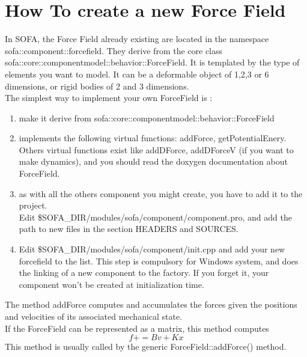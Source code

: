
\section{How To create a new Force Field}

In SOFA, the Force Field already existing are located in the namespace sofa::component::forcefield. They derive from the core class sofa::core::componentmodel::behavior::ForceField. It is templated by the type of elements you want to model. It can be a deformable object of 1,2,3 or 6 dimensions, or rigid bodies of 2 and 3 dimensions.\\
The simplest way to implement your own ForceField is :
\begin{enumerate}
 \item make it derive from sofa::core::componentmodel::behavior::ForceField
 \item implements the following virtual functions: addForce, getPotentialEnery. Others virtual functions exist like  addDForce, addDForceV (if you want to make dynamics), and you should read the doxygen documentation about ForceField. 
 \item as with all the others component you might create, you have to add it to the project. \\Edit \$SOFA\_DIR/modules/sofa/component/component.pro, and add the path to new files in the section HEADERS and SOURCES.
 \item Edit \$SOFA\_DIR/modules/sofa/component/init.cpp and add your new forcefield to the list. This step is compulsory for Windows system, and does the linking of a new component to the factory. If you forget it, your component won't be created at initialization time.
\end{enumerate}

The method addForce computes and accumulates the forces given the positions and velocities of its associated mechanical state.\\
If the ForceField can be represented as a matrix, this method computes
    $$ f += B v + K x $$
     This method is usually called by the generic ForceField::addForce() method.
